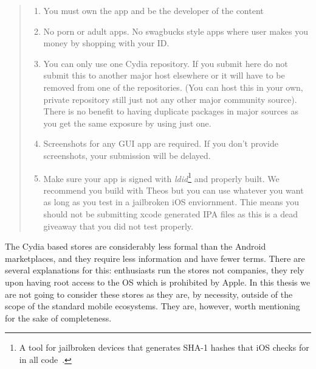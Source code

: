 \documentclass[thesis.tex]{subfiles}
\begin{document}
\begin{quotation}\noindent
  \begin{enumerate}
    \item You must own the app and be the developer of the content

    \item No porn or adult apps. No swagbucks style apps where user
      makes you money by shopping with your ID.

    \item You can only use one Cydia repository. If you submit here do
      not submit this to another major host elsewhere or it will have to be
      removed from one of the repositories. (You can host this in your own,
      private repository still just not any other major community
      source). There is no benefit to having duplicate packages in major
      sources as you get the same exposure by using just one.

    \item Screenshots for any GUI app are required. If you don't
      provide screenshots, your submission will be delayed.

    \item Make sure your app is signed with \emph{ldid}\footnote{A
        tool for jailbroken devices that generates SHA-1 hashes that iOS
        checks for in all code~\cite{saurik_code_nodate}.} and properly
      built. We recommend you build with Theos but you can use whatever you
      want as long as you test in a jailbroken iOS enviornment. Thie means
      you should not be submitting xcode generated IPA files as this is a
      dead giveaway that you did not test properly.
  \end{enumerate}
\end{quotation}

The Cydia based stores are considerably less formal than the Android
marketplaces, and they require less information and have fewer terms.
There are several explanations for this: enthusiasts run the stores
not companies, they rely upon having root access to the OS which is
prohibited by Apple.  In this thesis we are not going to consider
these stores as they are, by necessity, outside of the scope of the
standard mobile ecosystems.  They are, however, worth mentioning for
the sake of completeness.

\end{document}
